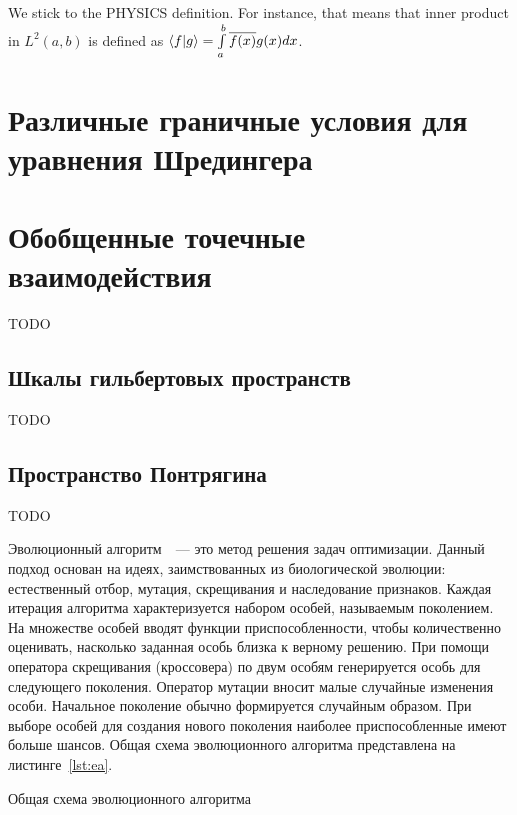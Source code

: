We stick to the PHYSICS definition. For instance, that means that inner product in $L^2(a, b)$ is defined as $\ip{f}{g} = \int\limits_a^b \cconj{f(x)} g(x) dx$.

\section{Различные граничные условия для уравнения Шредингера}

\section{Обобщенные точечные взаимодействия}
TODO
\subsection{Шкалы гильбертовых пространств}
TODO
\subsection{Пространство Понтрягина}
TODO


Эволюционный алгоритм~\cite{general_EA}~--- это метод решения задач оптимизации. Данный подход основан на идеях, заимствованных из биологической эволюции: 
естественный отбор, мутация, скрещивания и наследование признаков. Каждая итерация алгоритма характеризуется набором особей, называемым поколением. На множестве 
особей вводят функции приспособленности, чтобы количественно оценивать, насколько заданная особь близка к верному решению. При помощи оператора скрещивания 
(кроссовера) по двум особям генерируется особь для следующего поколения. Оператор мутации вносит малые случайные изменения особи. Начальное поколение обычно 
формируется случайным образом. При выборе особей для создания нового поколения наиболее приспособленные имеют больше шансов. Общая схема эволюционного 
алгоритма представлена на листинге~\ref{lst:ea}.

\begin{algorithm}[h!]
\caption{Общая схема эволюционного алгоритма}
\label{lst:ea}
\begin{algorithmic}[1]
  \ENDWHILE  
\end{algorithmic}
\end{algorithm}

